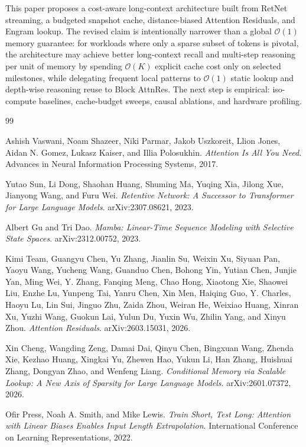 \documentclass[11pt]{article}
\newcommand{\Oh}{\mathcal{O}}
\begin{document}
This paper proposes a cost-aware long-context architecture built from RetNet streaming, a budgeted snapshot cache, distance-biased Attention Residuals, and Engram lookup. The revised claim is intentionally narrower than a global $\Oh(1)$ memory guarantee: for workloads where only a sparse subset of tokens is pivotal, the architecture may achieve better long-context recall and multi-step reasoning per unit of memory by spending $\Oh(K)$ explicit cache cost only on selected milestones, while delegating frequent local patterns to $\Oh(1)$ static lookup and depth-wise reasoning reuse to Block AttnRes. The next step is empirical: iso-compute baselines, cache-budget sweeps, causal ablations, and hardware profiling.

\begin{thebibliography}{99}

Ashish Vaswani, Noam Shazeer, Niki Parmar, Jakob Uszkoreit, Llion Jones, Aidan N. Gomez, Lukasz Kaiser, and Illia Polosukhin.
\textit{Attention Is All You Need}.
Advances in Neural Information Processing Systems, 2017.

Yutao Sun, Li Dong, Shaohan Huang, Shuming Ma, Yuqing Xia, Jilong Xue, Jianyong Wang, and Furu Wei.
\textit{Retentive Network: A Successor to Transformer for Large Language Models}.
arXiv:2307.08621, 2023.

Albert Gu and Tri Dao.
\textit{Mamba: Linear-Time Sequence Modeling with Selective State Spaces}.
arXiv:2312.00752, 2023.

Kimi Team, Guangyu Chen, Yu Zhang, Jianlin Su, Weixin Xu, Siyuan Pan, Yaoyu Wang, Yucheng Wang, Guanduo Chen, Bohong Yin, Yutian Chen, Junjie Yan, Ming Wei, Y. Zhang, Fanqing Meng, Chao Hong, Xiaotong Xie, Shaowei Liu, Enzhe Lu, Yunpeng Tai, Yanru Chen, Xin Men, Haiqing Guo, Y. Charles, Haoyu Lu, Lin Sui, Jinguo Zhu, Zaida Zhou, Weiran He, Weixiao Huang, Xinran Xu, Yuzhi Wang, Guokun Lai, Yulun Du, Yuxin Wu, Zhilin Yang, and Xinyu Zhou.
\textit{Attention Residuals}.
arXiv:2603.15031, 2026.

Xin Cheng, Wangding Zeng, Damai Dai, Qinyu Chen, Bingxuan Wang, Zhenda Xie, Kezhao Huang, Xingkai Yu, Zhewen Hao, Yukun Li, Han Zhang, Huishuai Zhang, Dongyan Zhao, and Wenfeng Liang.
\textit{Conditional Memory via Scalable Lookup: A New Axis of Sparsity for Large Language Models}.
arXiv:2601.07372, 2026.

Ofir Press, Noah A. Smith, and Mike Lewis.
\textit{Train Short, Test Long: Attention with Linear Biases Enables Input Length Extrapolation}.
International Conference on Learning Representations, 2022.


\end{thebibliography}
\end{document}
